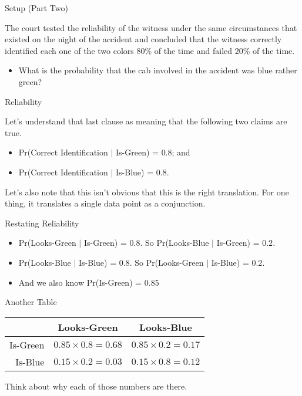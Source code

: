 \documentclass[
  ignorenonframetext,
]{beamer}
\providecommand{\tightlist}{%
  \setlength{\itemsep}{0pt}\setlength{\parskip}{0pt}}
\renewcommand{\,}{\text{, }}
\begin{document}
\begin{frame}{Setup (Part Two)}
\protect\hypertarget{setup-part-two}{}

The court tested the reliability of the witness under the same
circumstances that existed on the night of the accident and concluded
that the witness correctly identified each one of the two colors 80\% of
the time and failed 20\% of the time.

\begin{itemize}
\tightlist
\item
  What is the probability that the cab involved in the accident was blue
  rather green?
\end{itemize}

\end{frame}

\begin{frame}{Reliability}
\protect\hypertarget{reliability}{}

Let's understand that last clause as meaning that the following two
claims are true.

\begin{itemize}
\tightlist
\item
  Pr(Correct Identification \(|\) Is-Green) = \(0.8\); and
\item
  Pr(Correct Identification \(|\) Is-Blue) = \(0.8\).
\end{itemize}

Let's also note that this isn't obvious that this is the right
translation. For one thing, it translates a single data point as a
conjunction.

\end{frame}

\begin{frame}{Restating Reliability}
\protect\hypertarget{restating-reliability}{}

\begin{itemize}
\tightlist
\item
  Pr(Looks-Green \(|\) Is-Green) = \(0.8\). \pause So Pr(Looks-Blue
  \(|\) Is-Green) = \(0.2\). \pause
\item
  Pr(Looks-Blue \(|\) Is-Blue) = \(0.8\). \pause So Pr(Looks-Green \(|\)
  Is-Blue) = \(0.2\). \pause
\item
  And we also know Pr(Is-Green) = \(0.85\)
\end{itemize}

\end{frame}

\begin{frame}{Another Table}
\protect\hypertarget{another-table}{}

\begin{longtable}[]{@{}rcc@{}}
\toprule
& Looks-Green & Looks-Blue\tabularnewline
\midrule
\endhead
Is-Green & \(0.85 \times 0.8 = 0.68\) &
\(0.85 \times 0.2 = 0.17\)\tabularnewline
Is-Blue & \(0.15 \times 0.2 = 0.03\) &
\(0.15 \times 0.8 = 0.12\)\tabularnewline
\bottomrule
\end{longtable}

Think about why each of those numbers are there.

\end{frame}
\end{document}
